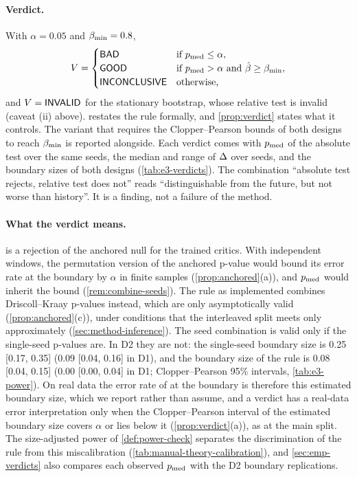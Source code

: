 \paragraph{Verdict.}
With $\alpha=0.05$ and $\beta_{\min}=0.8$,
\begin{equation}\label{eq:verdict}
  V=\begin{cases}
    \textsf{BAD} & \text{if } p_{\mathrm{med}}\le\alpha,\\
    \textsf{GOOD} & \text{if } p_{\mathrm{med}}>\alpha \text{ and } \hat\beta\ge\beta_{\min},\\
    \textsf{INCONCLUSIVE} & \text{otherwise,}
  \end{cases}
\end{equation}
and $V=\textsf{INVALID}$ for the stationary bootstrap, whose relative test is invalid (caveat (ii)
above).  restates the rule formally, and \cref{prop:verdict} states what it
controls. The variant that requires the Clopper--Pearson bounds of both designs to reach $\beta_{\min}$
is reported alongside. Each verdict comes with $p_{\mathrm{med}}$ of the absolute \WC{} test over the same
seeds, the median and range of $\Delta$ over seeds, and the boundary sizes of both designs
(\cref{tab:e3-verdicts}). The combination ``absolute test rejects, relative test does not''
reads ``distinguishable from the future, but not worse than history''. It is a finding, not a
failure of the method.

\paragraph{What the verdict means.}
\BAD{} is a rejection of the anchored null for the trained critics. With independent windows,
the permutation version of the anchored p-value would bound its error rate at the boundary by
$\alpha$ in finite samples (\cref{prop:anchored}(a)), and $p_{\mathrm{med}}$ would inherit the bound
(\cref{rem:combine-seeds}). The rule as implemented combines Driscoll--Kraay p-values instead,
which are only asymptotically valid (\cref{prop:anchored}(c)), under conditions that the
interleaved split meets only approximately (\cref{sec:method-inference}). The seed combination
is valid only if the single-seed p-values are. In D2 they are not: the single-seed boundary size
is 0.25 [0.17, 0.35] (0.09 [0.04, 0.16] in D1), and the boundary size of the rule is
0.08 [0.04, 0.15] (0.00 [0.00, 0.04] in D1; Clopper--Pearson 95\% intervals,
\cref{tab:e3-power}). On real data the error rate of \BAD{} at the boundary is therefore this
estimated boundary size, which we report rather than assume, and a \BAD{} verdict has a real-data
error interpretation only when the Clopper--Pearson interval of the estimated boundary size covers
$\alpha$ or lies below it (\cref{prop:verdict}(a)), as at the main split. The size-adjusted power
of \cref{def:power-check} separates the discrimination of the rule from this miscalibration
(\cref{tab:manual-theory-calibration}), and \cref{sec:emp-verdicts} also compares each observed
$p_{\mathrm{med}}$ with the D2 boundary replications.

